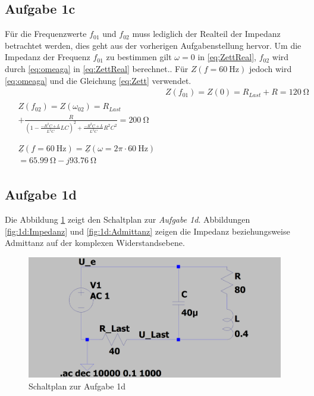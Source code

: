 \documentclass[
	journal,
	a4paper,
]{IEEEtran}
\newcommand{\aufgabe}[1]{\emph{Aufgabe #1}}
\newcommand{\bildbreite}{0.95\columnwidth}
\begin{document}
	\subsection*{Aufgabe 1c}
	Für die Frequenzwerte \(f_{01}\) und \(f_{02}\) muss lediglich der Realteil der Impedanz betrachtet werden, dies geht aus der vorherigen Aufgabenstellung hervor. Um die Impedanz der Frequenz \(f_{01}\) zu bestimmen gilt \(\omega=0\) in \eqref{eq:ZettReal}, \(f_{02}\) wird durch \eqref{eq:omeaga} in \eqref{eq:ZettReal} berechnet.. Für \(Z(f=\SI{60}{\hertz})\) jedoch wird \eqref{eq:omeaga} und die Gleichung \eqref{eq:Zett} verwendet.
	\begin{align}
		&Z(f_{01})=Z(0)=R_{Last}+R=\SI{120}{\ohm}\\[1ex]
		\begin{split}
			&Z(f_{02})=Z(\omega_{02})=R_{Last}\\
			&+\frac{R}{\left(1-{\frac{-R^2C+L}{L^2C}} LC\right)^2+{\frac{-R^2C+L}{L^2C}} R^2 C^2}=\SI{200}{\ohm}\\
		\end{split}\\[1ex]
		\begin{split}		
			&\underline{Z}(f=\SI{60}{\hertz})=\underline{Z}(\omega=2\pi\cdot\SI{60}{\hertz})\\
			&=\SI{65,99}{\ohm}-j\SI{93,76}{\ohm}
		\end{split}
 		\end{align}
	
	\subsection*{Aufgabe 1d}
	Die Abbildung \ref{fig:1d:Schaltplan} zeigt den Schaltplan zur \aufgabe{1d}. Abbildungen \ref{fig:1d:Impedanz} und \ref{fig:1d:Admittanz} zeigen die Impedanz beziehungsweise Admittanz auf der komplexen Widerstandsebene.
	\begin{figure}
		\centering
		\includegraphics[width=\bildbreite]{Schaltplan.png}
		\caption{Schaltplan zur Aufgabe 1d}			
		\label{fig:1d:Schaltplan}
	\end{figure}
	
\end{document}
